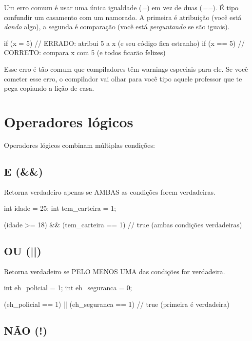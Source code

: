 Um erro comum é usar uma única igualdade (\textit{=}) em vez de duas (\textit{==}). É tipo confundir um casamento com um namorado. A primeira é atribuição (você está \textit{dando} algo), a segunda é comparação (você está \textit{perguntando} se são iguais).

\begin{ccode}
  if (x = 5) { }    // ERRADO: atribui 5 a x (e seu código fica estranho)
  if (x == 5) { }   // CORRETO: compara x com 5 (e todos ficarão felizes)
\end{ccode}

Esse erro é tão comum que compiladores têm warnings especiais para ele. Se você cometer esse erro, o compilador vai olhar para você tipo aquele professor que te pega copiando a lição de casa.

\section{Operadores lógicos}

Operadores lógicos combinam múltiplas condições:

\subsection{E (&&)}

Retorna verdadeiro apenas se AMBAS as condições forem verdadeiras.

\begin{ccode}
  int idade = 25;
  int tem_carteira = 1;

  (idade >= 18) && (tem_carteira == 1)  // true (ambas condições verdadeiras)
\end{ccode}

\subsection{OU (||)}

Retorna verdadeiro se PELO MENOS UMA das condições for verdadeira.

\begin{ccode}
  int eh_policial = 1;
  int eh_seguranca = 0;

  (eh_policial == 1) || (eh_seguranca == 1)  // true (primeira é verdadeira)
\end{ccode}

\subsection{NÃO (!)}

